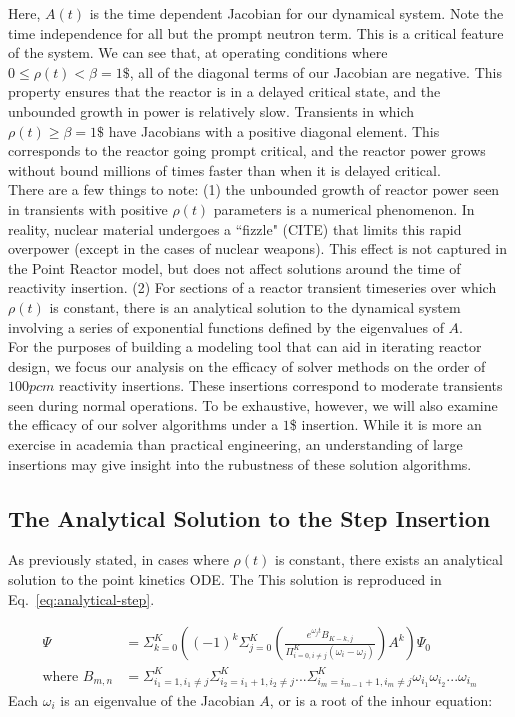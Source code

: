 \documentclass[review,onefignum,onetabnum]{siamart171218}
\begin{document}
Here, $A(t)$ is the time dependent Jacobian for our dynamical system. Note the
time independence for all but the prompt neutron term. This is a critical feature
of the system. We can see that, at operating conditions where $0 \leq \rho(t) < \beta = 1\$$,
all of the diagonal terms of our Jacobian are negative. This property ensures
that the reactor is in a delayed critical state, and the unbounded growth in power
is relatively slow. Transients in which $\rho(t) \geq \beta = 1\$$ have Jacobians with
a positive diagonal element. This corresponds to the reactor going prompt critical, and
the reactor power grows without bound millions of times faster than when it is delayed
critical. \\

There are a few things to note: (1) the unbounded growth of reactor power seen
in transients with positive $\rho(t)$ parameters is a numerical phenomenon. In reality,
nuclear material undergoes a ``fizzle" (CITE) that limits this rapid overpower (except
in the cases of nuclear weapons). This effect is not captured in the Point Reactor
model, but does not affect solutions around the time of reactivity insertion. (2) For
sections of a reactor transient timeseries over which $\rho(t)$ is constant, there is an
analytical solution to the dynamical system involving a series of exponential functions
defined by the eigenvalues of $A$. \\

For the purposes of building a modeling tool that can aid in iterating reactor design,
we focus our analysis on the efficacy of solver methods on the order of $100 pcm$
reactivity insertions. These insertions correspond to moderate transients seen during
normal operations. To be exhaustive, however, we will also examine the efficacy of our
solver algorithms under a $1$\$ insertion. While it is more an exercise in academia than
practical engineering, an understanding of large insertions may give insight into the
rubustness of these solution  algorithms.

\subsection{The Analytical Solution to the Step Insertion}
As previously stated, in cases where $\rho(t)$ is constant, there exists an
analytical solution to the point kinetics ODE. The  This solution is reproduced in
Eq.~\cref{eq:analytical-step}.

\begin{align}
  \label{eq:analytical-step}
  \Psi &= \Sigma_{k=0}^K \left( (-1)^k \Sigma_{j=0}^K \left( \frac{e^{\omega_jt}B_{K-k,j}}{\Pi_{i=0, i\neq j}^K (\omega_i - \omega_j)}\right) A^k\right)\Psi_0\\
  \text{where } B_{m,n} &= \Sigma_{i_1 = 1, i_1 \neq j}^K \Sigma_{i_2 = i_1 + 1, i_2 \neq j}^K ...\Sigma_{i_m = i_{m-1} + 1, i_m \neq j}^K \omega_{i_1}\omega_{i_2}...\omega_{i_m}
\end{align}
\cite{Analytical}
Each $\omega_i$ is an eigenvalue of the Jacobian $A$, or is a root of the inhour
equation:
\end{document}
